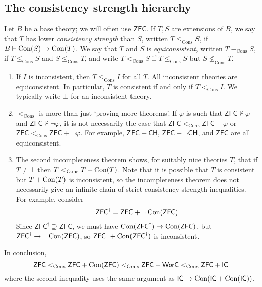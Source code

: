 \subsection{The consistency strength hierarchy}
Let \( B \) be a base theory; we will often use \( \mathsf{ZFC} \).
If \( T, S \) are extensions of \( B \), we say that \( T \) has lower \emph{consistency strength} than \( S \), written \( T \leq_{\mathrm{Cons}} S \), if \( B \vdash \operatorname{Con}(S) \to \operatorname{Con}(T) \).
We say that \( T \) and \( S \) is \emph{equiconsistent}, written \( T \equiv_{\mathrm{Cons}} S \), if \( T \leq_{\mathrm{Cons}} S \) and \( S \leq_{\mathrm{Cons}} T \), and write \( T <_{\mathrm{Cons}} S \) if \( T \leq_{\mathrm{Cons}} S \) but \( S \nleq_{\mathrm{Cons}} T \).
\begin{remark}
    \begin{enumerate}
        \item If \( I \) is inconsistent, then \( T \leq_{\mathrm{Cons}} I \) for all \( T \).
        All inconsistent theories are equiconsistent.
        In particular, \( T \) is consistent if and only if \( T <_{\mathrm{Cons}} I \).
        We typically write \( \bot \) for an inconsistent theory.
        \item \( <_{\mathrm{Cons}} \) is more than just `proving more theorems'.
        If \( \varphi \) is such that \( \mathsf{ZFC} \nvdash \varphi \) and \( \mathsf{ZFC} \nvdash \neg\varphi \), it is not necessarily the case that \( \mathsf{ZFC} <_{\mathrm{Cons}} \mathsf{ZFC} + \varphi \) or \( \mathsf{ZFC} <_{\mathrm{Cons}} \mathsf{ZFC} + \neg\varphi \).
        For example, \( \mathsf{ZFC} + \mathsf{CH} \), \( \mathsf{ZFC} + \neg\mathsf{CH} \), and \( \mathsf{ZFC} \) are all equiconsistent.
        \item The second incompleteness theorem shows, for suitably nice theories \( T \), that if \( T \neq \bot \) then \( T <_{\mathrm{Cons}} T + \operatorname{Con}(T) \).
        Note that it is possible that \( T \) is consistent but \( T + \operatorname{Con}(T) \) is inconsistent, so the incompleteness theorem does not necessarily give an infinite chain of strict consistency strength inequalities.
        For example, consider
        \[ \mathsf{ZFC}^\dagger = \mathsf{ZFC} + \neg\operatorname{Con}(\mathsf{ZFC}) \]
        Since \( \mathsf{ZFC}^\dagger \supseteq \mathsf{ZFC} \), we must have \( \operatorname{Con}(\mathsf{ZFC}^\dagger) \to \operatorname{Con}(\mathsf{ZFC}) \), but \( \mathsf{ZFC}^\dagger \to \neg\operatorname{Con}(\mathsf{ZFC}) \), so \( \mathsf{ZFC}^\dagger + \operatorname{Con}(\mathsf{ZFC}^\dagger) \) is inconsistent.
    \end{enumerate}
\end{remark}
In conclusion,
\[ \mathsf{ZFC} <_{\mathrm{Cons}} \mathsf{ZFC} + \operatorname{Con}(\mathsf{ZFC}) <_{\mathrm{Cons}} \mathsf{ZFC} + \mathsf{WorC} <_{\mathrm{Cons}} \mathsf{ZFC} + \mathsf{IC} \]
where the second inequality uses the same argument as \( \mathsf{IC} \to \operatorname{Con}(\mathsf{IC} + \operatorname{Con}(\mathsf{IC})) \).

